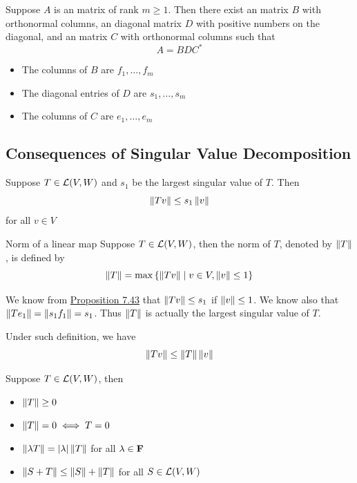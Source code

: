 \documentclass[12pt,a4paper]{article}
\begin{document}
    \begin{prop}
        Suppose $A$ is an  matrix of rank $m\geq1$. Then there exist an  matrix $B$ with orthonormal columns, an  diagonal matrix $D$ with positive numbers on the diagonal, and an  matrix $C$ with orthonormal columns such that
        $$
        A=BDC^*
        $$
    \end{prop}
    \begin{remark}
        \hfill
    
        \begin{itemize}
            \item The columns of $B$ are $f_1,\dots,f_m$
            \item The diagonal entries of $D$ are $s_1,\dots,s_m$
            \item The columns of $C$ are $e_1,\dots,e_m$
        \end{itemize}
    \end{remark}
    \hfill

    \subsection{Consequences of Singular Value Decomposition}
    \begin{prop}\label{7.43}
        Suppose $T\in\mathcal{L}(V,W)$ and $s_1$ be the largest singular value of $T$. Then
        $$
        \left\lVert Tv\right\rVert\leq s_1\left\lVert v\right\rVert
        $$
        for all $v\in V$
    \end{prop}
    \hfill

    \begin{defi}{Norm of a linear map}
        Suppose $T\in\mathcal{L}(V,W)$, then the norm of $T$, denoted by $\left\lVert T\right\rVert$, is defined by
        $$
        \left\lVert T\right\rVert=\max\left\{\left\lVert Tv\right\rVert\mid v\in V, \left\lVert v\right\rVert\leq1\right\}
        $$
    \end{defi}
    \begin{remark}
        We know from \hyperref[7.43]{Proposition 7.43} that $\left\lVert Tv\right\rVert\leq s_1$ if $\left\lVert v\right\rVert\leq1$. We know also that $\left\lVert Te_1\right\rVert=\left\lVert s_1f_1\right\rVert=s_1$. Thus $\left\lVert T\right\rVert$ is actually the largest singular value of $T$.
    \end{remark}
    \begin{remark}
        Under such definition, we have
        $$
        \left\lVert Tv\right\rVert\leq\left\lVert T\right\rVert\left\lVert v\right\rVert
        $$
    \end{remark}
    \begin{prop}
        Suppose $T\in\mathcal{L}(V,W)$, then
        \begin{itemize}
            \item $\left\lVert T\right\rVert\geq0$
            \item $\left\lVert T\right\rVert=0\iff T=0$
            \item $\left\lVert \lambda T\right\rVert=\left\lvert \lambda\right\rvert\left\lVert T\right\rVert$ for all $\lambda\in\mathbf{F}$
            \item $\left\lVert S+T\right\rVert\leq\left\lVert S\right\rVert+\left\lVert T\right\rVert$ for all $S\in\mathcal{L}(V,W)$
        \end{itemize}
    \end{prop}
    \hfill
\end{document}
